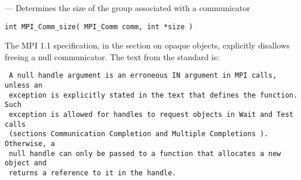 \startmanpage
{}
--- Determines the size of the group associated with a communicator 
\startvb\begin{verbatim}
int MPI_Comm_size( MPI_Comm comm, int *size ) 

\end{verbatim}
\endvb

\par
{}
\par
{}
\par
{}
The MPI 1.1 specification, in the section on opaque objects, explicitly
disallows freeing a null communicator.  The text from the standard is:
\begin{verbatim}
 A null handle argument is an erroneous IN argument in MPI calls, unless an
 exception is explicitly stated in the text that defines the function. Such
 exception is allowed for handles to request objects in Wait and Test calls
 (sections Communication Completion and Multiple Completions ). Otherwise, a
 null handle can only be passed to a function that allocates a new object and
 returns a reference to it in the handle.
\end{verbatim}

